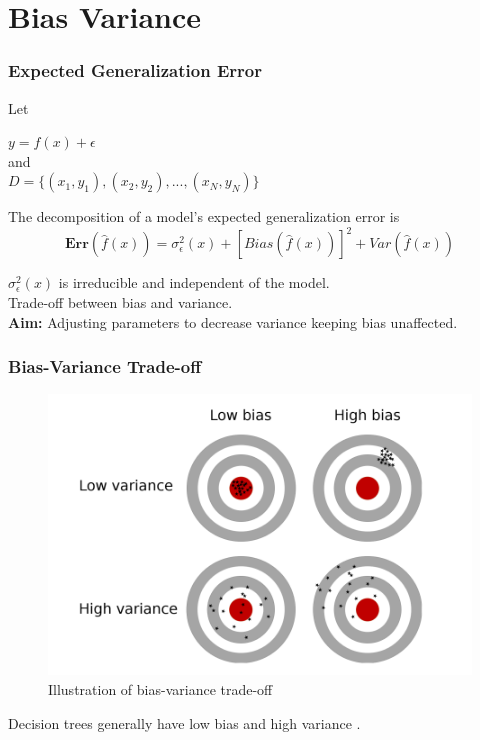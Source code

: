 
\section{Bias Variance}

\begin{frame}
    \frametitle{Expected Generalization Error}
    Let 
    \begin{center}
        $y = f(x) + \epsilon$ \\
        and\\
        $D = \{(x_{1},y_{1}), (x_{2}, y_{2}), ... , (x_{N}, y_{N})\}$
    \end{center}   
    The decomposition of a model's expected generalization error is
    \begin{equation}
        \boldsymbol{Err}(\hat{f}(x)) = \sigma_{\epsilon}^2(x) + [Bias(\hat{f}(x))]^2 + Var(\hat{f}(x))
    \end{equation}
    
    $\sigma_{\epsilon}^2(x)$ is irreducible and independent of the model. \\
    \bigskip
    Trade-off between bias and variance. \\
    \textbf{Aim:} Adjusting parameters to decrease variance keeping bias unaffected.
\end{frame}

\begin{frame}
    \frametitle{Bias-Variance Trade-off}
    \begin{figure}      
        \includegraphics{images/bias-variance.png}
        \caption{Illustration of bias-variance trade-off \cite{van2019bias}}
    \end{figure}
    Decision trees generally have low bias and high variance \cite{friedman2001elements}.

\end{frame}

